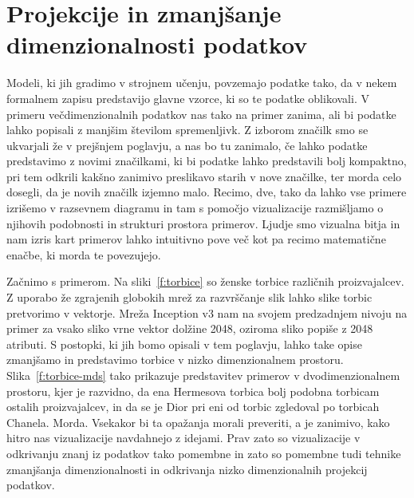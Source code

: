 \chapter{Projekcije in zmanjšanje dimenzionalnosti podatkov}

Modeli, ki jih gradimo v strojnem učenju, povzemajo podatke tako, da v nekem formalnem zapisu predstavijo glavne vzorce, ki so te podatke oblikovali. V primeru večdimenzionalnih podatkov nas tako na primer zanima, ali bi podatke lahko popisali z manjšim številom spremenljivk. Z izborom značilk smo se ukvarjali že v prejšnjem poglavju, a nas bo tu zanimalo, če lahko podatke predstavimo z novimi značilkami, ki bi podatke lahko predstavili bolj kompaktno, pri tem odkrili kakšno zanimivo preslikavo starih v nove značilke, ter morda celo dosegli, da je novih značilk izjemno malo. Recimo, dve, tako da lahko vse primere izrišemo v razsevnem diagramu in tam s pomočjo vizualizacije razmišljamo o njihovih podobnosti in strukturi prostora primerov. Ljudje smo vizualna bitja in nam izris kart primerov lahko intuitivno pove več kot pa recimo matematične enačbe, ki morda te povezujejo.

Začnimo s primerom. Na sliki~\ref{f:torbice} so ženske torbice različnih proizvajalcev. Z uporabo že zgrajenih globokih mrež za razvrščanje slik lahko slike torbic pretvorimo v vektorje. Mreža Inception v3 nam na svojem predzadnjem nivoju na primer za vsako sliko vrne vektor dolžine 2048, oziroma sliko popiše z 2048 atributi. S postopki, ki jih bomo opisali v tem poglavju, lahko take opise zmanjšamo in predstavimo torbice v nizko dimenzionalnem prostoru. Slika~\ref{f:torbice-mds} tako prikazuje predstavitev primerov v dvodimenzionalnem prostoru, kjer je razvidno, da ena Hermesova torbica bolj podobna torbicam ostalih proizvajalcev, in da se je Dior pri eni od torbic zgledoval po torbicah Chanela. Morda. Vsekakor bi ta opažanja morali preveriti, a je zanimivo, kako hitro nas vizualizacije navdahnejo z idejami. Prav zato so vizualizacije v odkrivanju znanj iz podatkov tako pomembne in zato so pomembne tudi tehnike zmanjšanja dimenzionalnosti in odkrivanja nizko dimenzionalnih projekcij podatkov.

\begin{figure}[htbp]
\end{figure}

